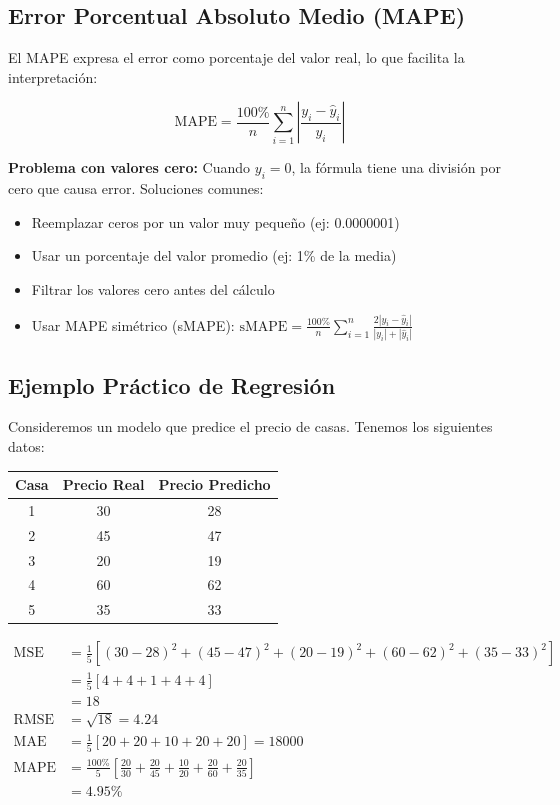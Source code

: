 \documentclass[12pt]{article}
\begin{document}
\subsection{Error Porcentual Absoluto Medio (MAPE)}

El MAPE expresa el error como porcentaje del valor real, lo que facilita la interpretación:

\[
\text{MAPE} = \frac{100\%}{n} \sum_{i=1}^{n} \left|\frac{y_i - \hat{y}_i}{y_i}\right|
\]

\textbf{Problema con valores cero:} Cuando $y_i = 0$, la fórmula tiene una división por cero que causa error. Soluciones comunes:
\begin{itemize}
    \item Reemplazar ceros por un valor muy pequeño (ej: 0.0000001)
    \item Usar un porcentaje del valor promedio (ej: 1\% de la media)
    \item Filtrar los valores cero antes del cálculo
    \item Usar MAPE simétrico (sMAPE): $\text{sMAPE} = \frac{100\%}{n} \sum_{i=1}^{n} \frac{2|y_i - \hat{y}_i|}{|y_i| + |\hat{y}_i|}$
\end{itemize}

\subsection{Ejemplo Práctico de Regresión}

Consideremos un modelo que predice el precio de casas. Tenemos los siguientes datos:

\begin{center}
\begin{tabular}{|c|c|c|}
\hline
\textbf{Casa} & \textbf{Precio Real} & \textbf{Precio Predicho} \\
\hline
1 & 30 & 28 \\
2 & 45 & 47 \\
3 & 20 & 19 \\
4 & 60 & 62 \\
5 & 35 & 33 \\
\hline
\end{tabular}
\end{center}

\begin{align*}
\text{MSE} &= \frac{1}{5}[(30-28)^2 + (45-47)^2 + (20-19)^2 + (60-62)^2 + (35-33)^2] \\
&= \frac{1}{5}[4 + 4 + 1 + 4 + 4] \\
&= 18 \\
\text{RMSE} &= \sqrt{18} = 4.24 \\
\text{MAE} &= \frac{1}{5}[20 + 20 + 10 + 20 + 20] = 18000 \\
\text{MAPE} &= \frac{100\%}{5}[\frac{20}{30} + \frac{20}{45} + \frac{10}{20} + \frac{20}{60} + \frac{20}{35}] \\
&= 4.95\%
\end{align*}
\end{document}
